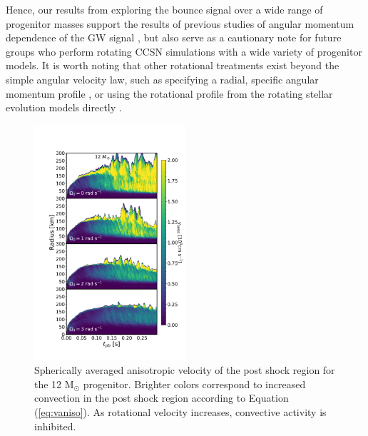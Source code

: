 \documentclass[twocolumn,times]{aastex62}  %
\newcommand{\Msun}{\ensuremath{\mathrm{M}_\odot}\xspace}
\begin{document}
Hence, our results from exploring the bounce signal over a wide range of progenitor masses support the results of previous studies of angular momentum dependence of the GW signal \citet{dimm:2008,abdik:2010,abdik:2014}, but also serve as a cautionary note for future groups who perform rotating CCSN simulations with a wide variety of progenitor models.  
It is worth noting that other rotational treatments exist beyond the simple angular velocity law, such as specifying a radial, specific angular momentum profile \citep[eg.][]{oconnor:2011}, or using the rotational profile from the rotating stellar evolution models directly \citep{summa:2018}.

\begin{figure}[h!]
    \centering
    \includegraphics[width=0.5\textwidth]{figures/vaniso.pdf}
    \caption{Spherically averaged anisotropic velocity of the post shock region for the 12 \Msun progenitor.  Brighter colors correspond to increased convection in the post shock region according to Equation (\ref{eq:vaniso}).  As rotational velocity increases, convective activity is inhibited.}
    \label{fig:vaniso}
\end{figure}
\end{document}
